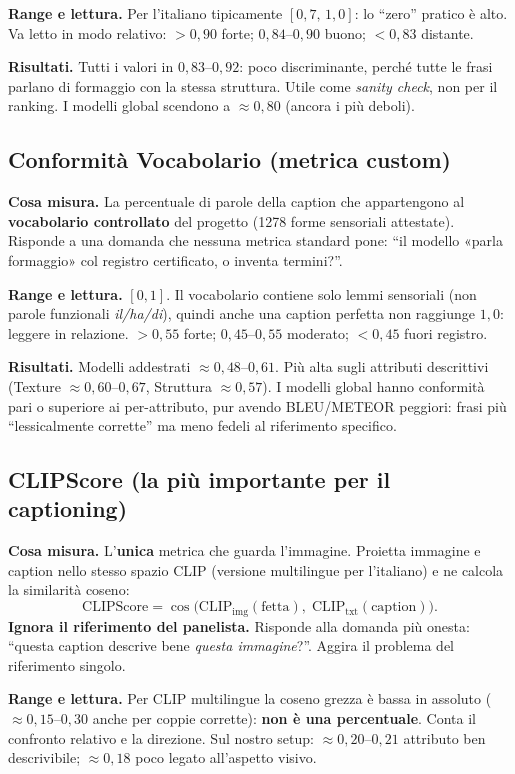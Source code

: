 \documentclass[11pt,a4paper]{article}
\begin{document}
\textbf{Range e lettura.} Per l'italiano tipicamente $[0{,}7,\,1{,}0]$: lo ``zero''
pratico è alto. Va letto in modo relativo: $>0{,}90$ forte; $0{,}84$--$0{,}90$
buono; $<0{,}83$ distante.

\textbf{Risultati.} Tutti i valori in $0{,}83$--$0{,}92$: poco discriminante,
perché tutte le frasi parlano di formaggio con la stessa struttura. Utile come
\emph{sanity check}, non per il ranking. I modelli global scendono a $\approx
0{,}80$ (ancora i più deboli).

\subsection{Conformità Vocabolario (metrica custom)}
\textbf{Cosa misura.} La percentuale di parole della caption che appartengono al
\textbf{vocabolario controllato} del progetto (1278 forme sensoriali attestate).
Risponde a una domanda che nessuna metrica standard pone: ``il modello «parla
formaggio» col registro certificato, o inventa termini?''.

\textbf{Range e lettura.} $[0,1]$. Il vocabolario contiene solo lemmi sensoriali
(non parole funzionali \textit{il/ha/di}), quindi anche una caption perfetta non
raggiunge $1{,}0$: leggere in relazione. $>0{,}55$ forte; $0{,}45$--$0{,}55$
moderato; $<0{,}45$ fuori registro.

\textbf{Risultati.} Modelli addestrati $\approx 0{,}48$--$0{,}61$. Più alta sugli
attributi descrittivi (Texture $\approx 0{,}60$--$0{,}67$, Struttura $\approx
0{,}57$). I modelli global hanno conformità pari o superiore ai per-attributo, pur
avendo BLEU/METEOR peggiori: frasi più ``lessicalmente corrette'' ma meno fedeli
al riferimento specifico.

\subsection{CLIPScore (la più importante per il captioning)}
\textbf{Cosa misura.} L'\textbf{unica} metrica che guarda l'immagine. Proietta
immagine e caption nello stesso spazio CLIP (versione multilingue per l'italiano)
e ne calcola la similarità coseno:
\[
\text{CLIPScore} = \cos\!\big(\text{CLIP}_{\text{img}}(\text{fetta}),\;
\text{CLIP}_{\text{txt}}(\text{caption})\big).
\]
\textbf{Ignora il riferimento del panelista.} Risponde alla domanda più onesta:
``questa caption descrive bene \emph{questa immagine}?''. Aggira il problema del
riferimento singolo.

\textbf{Range e lettura.} Per CLIP multilingue la coseno grezza è bassa in
assoluto ($\approx 0{,}15$--$0{,}30$ anche per coppie corrette): \textbf{non è una
percentuale}. Conta il confronto relativo e la direzione. Sul nostro setup:
$\approx 0{,}20$--$0{,}21$ attributo ben descrivibile; $\approx 0{,}18$ poco
legato all'aspetto visivo.
\end{document}
